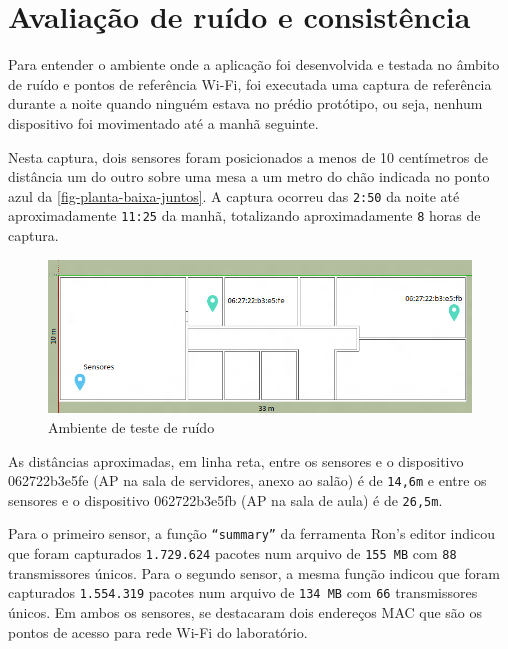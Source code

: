 \section{Avaliação de ruído e consistência}
\label{sec:teste-ruido}

Para entender o ambiente onde a aplicação foi desenvolvida e testada no âmbito
de ruído e pontos de referência Wi-Fi, foi executada uma captura de referência
durante a noite quando ninguém estava no prédio protótipo, ou seja, nenhum
dispositivo foi movimentado até a manhã seguinte.

Nesta captura, dois sensores foram posicionados a menos de 10
centímetros de distância um do outro sobre uma mesa a um metro do chão indicada no ponto
azul da \autoref{fig-planta-baixa-juntos}. A captura
ocorreu das \texttt{2:50} da noite até aproximadamente \texttt{11:25} da manhã, totalizando
aproximadamente \texttt{8} horas de captura.

\begin{figure}[htb]
	\caption{\label{fig-planta-baixa-juntos}Ambiente de teste de ruído}
	\begin{center}
		\includegraphics[width=1\textwidth]{060-testes/data-analisis/planta-baixa-ruido.png}
	\end{center}
\end{figure}

As distâncias aproximadas, em linha reta, entre os sensores e o dispositivo
062722b3e5fe (AP na sala de servidores, anexo ao salão) é de
\texttt{14,6m} e entre os sensores e o dispositivo
062722b3e5fb (AP na sala de aula) é de \texttt{26,5m}.

Para o primeiro sensor, a função \texttt{``summary''}  da ferramenta Ron’s editor
 indicou que foram capturados \texttt{1.729.624}
pacotes num arquivo de \texttt{155 MB} com \texttt{88} transmissores únicos.
Para o segundo sensor, a mesma função indicou que foram capturados \texttt{1.554.319}
pacotes num arquivo de \texttt{134 MB} com \texttt{66} transmissores únicos.
Em ambos os sensores, se destacaram dois endereços MAC que são os pontos de
acesso para rede Wi-Fi do laboratório.

